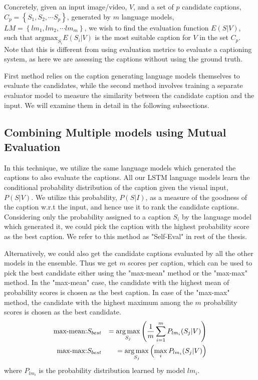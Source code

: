 Concretely, given an input image/video, $V$, and a set of $p$ candidate
captions, $C_p = \left\{S_1,S_2,\cdots S_p \right\}$, generated by $m$ language
models, $LM = \left\{lm_1,lm_2,\cdots lm_m \right\}$, we wish to find the
evaluation function $E(S|V)$, such that $\text{argmax}_{S_i} E(S_i|V)$ is the
most suitable caption for $V$ in the set $C_p$.
Note that this is different from using evaluation metrics to evaluate a
captioning system, as here we are assessing the captions without using the
ground truth. 

First method relies on the caption generating language models themselves to
evaluate the candidates, while the second method involves training a separate
evaluator model to measure the similarity between the candidate caption and the
input.
We will examine them in detail in the following subsections.

\subsection{Combining Multiple models using Mutual Evaluation}
\label{subsec:MutEval}

In this technique, we utilize the same language models which generated the
captions to also evaluate the captions.
All our LSTM language models learn the conditional probability distribution of
the caption given the visual input, $P(S|V)$.
We utilize this probability, $P(S|I)$, as a measure of the goodness of the
caption w.r.t the input, and hence use it to rank the candidate captions.
Considering only the probability assigned to a caption $S_i$ by the language
model which generated it, we could pick the caption with the highest probability
score as the best caption.
We refer to this method as "Self-Eval" in rest of the thesis. 

Alternatively, we could also get the candidate captions evaluated by all the
other models in the ensemble.
Thus we get $m$ scores per caption, which can be used to pick the best candidate
either using the "max-mean" method or the "max-max" method.
In the "max-mean" case, the candidate with the highest mean of probability
scores is chosen as the best caption.
In case of the "max-max" method, the candidate with the highest maximum among
the $m$ probability scores is chosen as the best candidate.
\begin{eqnarray}
  \label{eq:cmme} 
  \text{max-mean:}& S_{best} &= \operatorname*{arg\,max}_{S_j}\left(\frac{1}{m}\sum_{i=1}^{m}
  P_{lm_i}(S_j | V)\right)\\
  \text{max-max:}& S_{best} &= \operatorname*{arg\,max}_{S_j} \left(\max_i P_{lm_i}(S_j |
  V)\right)
\end{eqnarray}
\noindent where $P_{lm_i}$ is the probability distribution learned by model
$lm_i$.

